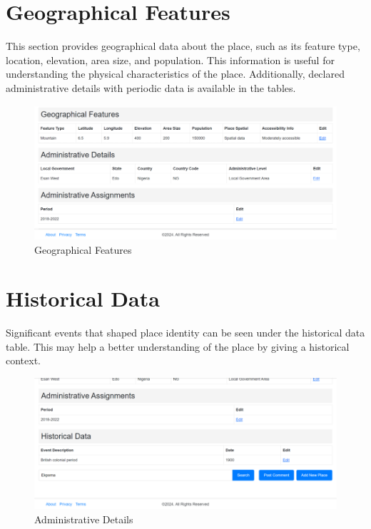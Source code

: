 \section{Geographical Features}
This section provides geographical data about the place, such as its feature type, location, elevation, area size, and population. This information is useful for understanding the physical characteristics of the place. Additionally, declared administrative details with periodic data is available in the tables.

\begin{figure}[H]
    \centering
    \includegraphics[width=\textwidth]{moreDetails2Geo.png}
    \caption{Geographical Features}
    \label{fig:moreDetails2Geo}
\end{figure}

\section{Historical Data}
Significant events that shaped place identity can be seen under the historical data table. This may help a better understanding of the place by giving a historical context.

\begin{figure}[H]
    \centering
    \includegraphics[width=\textwidth]{moreDetails3AdmDetails.png}
    \caption{Administrative Details}
    \label{fig:moreDetails3AdmDetails}
\end{figure}

